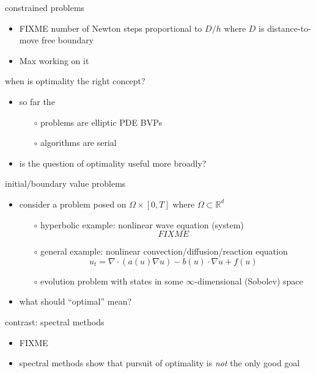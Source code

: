 \documentclass[hide notes,intlimits,usenames,dvipsnames]{beamer}
\newcommand{\RR}{\mathbb{R}}
\newcommand{\Div}{\nabla\cdot}
\newcommand{\grad}{\nabla}
\begin{document}
\begin{frame}{constrained problems}
\begin{itemize}
\item FIXME  number of Newton steps proportional to $D/h$ where $D$ is distance-to-move free boundary
\item Max working on it
\end{itemize}
\end{frame}


\begin{frame}{when is optimality the right concept?}
\begin{itemize}
\item so far the
    \begin{itemize}
    \item[$\circ$] problems are elliptic PDE BVPs
    \item[$\circ$] algorithms are serial
    \end{itemize}
\item is the question of optimality useful more broadly?
\end{itemize}
\end{frame}


\begin{frame}{initial/boundary value problems}

\begin{itemize}
\item consider a problem posed on $\Omega \times [0,T]$ where $\Omega \subset \RR^d$
    \begin{itemize}
    \item[$\circ$] hyperbolic example: nonlinear wave equation (system)
      $$FIXME$$
    \item[$\circ$] general example: nonlinear convection/diffusion/reaction equation
      $$u_t = \Div(a(u) \grad u) - b(u)\cdot \grad u + f(u)$$
    \item[$\circ$] evolution problem with states in some $\infty$-dimensional (Sobolev) space
    \end{itemize}
\item what should ``optimal'' mean?
\end{itemize}
\end{frame}


\begin{frame}{contrast: spectral methods}
\begin{itemize}
\item FIXME
\item spectral methods show that pursuit of optimality is \emph{not} the only good goal
\end{itemize}
\end{frame}
\end{document}
